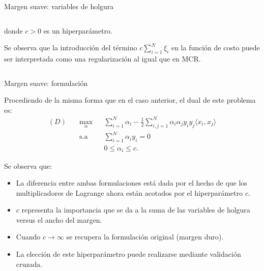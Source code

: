 \documentclass[handout, 9pt]{beamer}
\begin{document}
\begin{frame}{Margen suave: variables de holgura}
\begin{columns}
\begin{column}{0.5\textwidth}
donde $c>0$ es un hiperparámetro.\\ \pause

Se observa que la introducción del término $c\sum_{i=1}^{N} \xi_i$ en la función de costo puede ser interpretada como una regularización al igual que en MCR.

\end{column}

\end{columns}

\end{frame}

\begin{frame}{Margen suave: formulación}

Procediendo de la misma forma que en el caso anterior, el dual de este problema es:
\begin{equation*}
\begin{aligned}
(D)\quad & \underset{\alpha}{\text{max}}
& & \sum\limits_{i=1}^{N}\alpha_i - \frac{1}{2} \sum\limits_{i,j=1}^{N} \alpha_i \alpha_j y_i y_j \langle x_i, x_j\rangle\\
& \text{s.a}
& & \sum\limits_{i=1}^{N} \alpha_i y_i= 0 \\
& &  &0 \leq \alpha_i \leq c.
\end{aligned}
\end{equation*}\pause

Se observa que:

\begin{itemize}
	\item La diferencia entre ambas formulaciones está dada por el hecho de que los multiplicadores de Lagrange ahora están acotados por el hiperparámetro $c$.\pause
	\item $c$ representa la importancia que se da a la suma de las variables de holgura versus el ancho del margen.\pause
	\item Cuando $c\to\infty$ se recupera la formulación original (margen duro).\pause
	\item La elección de este hiperparámetro puede realizarse mediante validación cruzada.
\end{itemize}

\end{frame}
\end{document}
